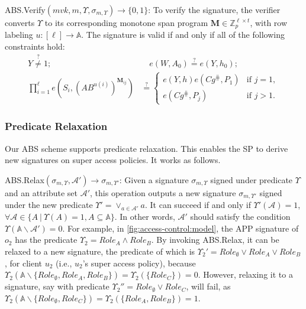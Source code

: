 \textsf{ABS.Verify}$(mvk, m, \Upsilon, \sigma_{m, \Upsilon}) \to \{0,1\}$:
To verify the signature, the verifier converts $\Upsilon$ to its corresponding monotone span program $\mathbf{M} \in \mathbb{Z}_p^{\ell \times t}$, with row labeling $u: [\ell] \to \mathbb{A}$. The signature is valid if and only if all of the following constraints hold:
\begin{align*}
  Y         \stackrel{?}{\neq} 1; \quad & \quad e(W,A_0)  \stackrel{?}{=} e(Y,h_0); \\
  \prod_{i=1}^\ell e \left( S_i, {(A B^{u(i)})}^{\mathbf{M}_{ij}}\right)
                                        & \stackrel{?}{=}  \left\{
                                          \begin{array}{ll}
                                            e(Y,h)e(Cg^{\hash},P_1)             & \text{if } j = 1,                        \\
                                            e(Cg^{\hash},P_j)                   & \text{if } j > 1.
                                        \end{array} \right.
\end{align*}

\subsubsection{Predicate Relaxation}\label{sec:access-control:abs-relax}

Our ABS scheme supports predicate relaxation. This enables the SP to derive new signatures on super access policies. It works as follows.

\textsf{ABS.Relax}$(\sigma_{m,\Upsilon}, \mathcal{A}') \to \sigma_{m,\Upsilon'}$:
Given a signature $\sigma_{m,\Upsilon}$ signed under predicate $\Upsilon$ and an attribute set $\mathcal{A}'$, this operation outputs a new signature $\sigma_{m,\Upsilon'}$ signed under the new predicate $\Upsilon' = \lor_{a \in \mathcal{A}'} a$. It can succeed if and only if $\Upsilon'(\mathcal{A}) = 1$, $\forall \mathcal{A} \in \{ A~|~\Upsilon(A) = 1, A \subseteq \mathbb{A} \}$. In other words, $\mathcal{A}'$ should satisfy the condition $\Upsilon(\mathbb{A}\backslash\mathcal{A}') = 0$.
For example, in \cref{fig:access-control:model}, the APP signature of $o_2$ has the predicate $\Upsilon_2 = {Role}_{A} \land {Role}_{B}$. By invoking \textsf{ABS.Relax}, it can be relaxed to a new signature, the predicate of which is $\Upsilon_2' = {Role}_{\emptyset} \lor {Role}_{A} \lor {Role}_{B}$, for client $u_2$ (i.e., $u_2$'s super access policy), because $\Upsilon_2(\mathbb{A}\backslash \{{Role}_{\emptyset}, {Role}_A, {Role}_B\}) = \Upsilon_2(\{{Role}_C\}) = 0$. However, relaxing it to a signature, say with predicate $\Upsilon_2'' = {Role}_{\emptyset} \lor {Role}_{C}$, will fail, as $\Upsilon_2(\mathbb{A}\backslash \{{Role}_{\emptyset}, {Role}_C\}) = \Upsilon_2(\{{Role}_A, {Role}_B\}) = 1$.

